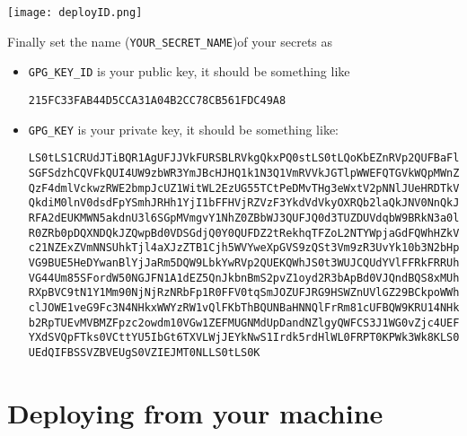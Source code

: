 \documentclass{ximera}
\begin{document}
\begin{image}
    \texttt{[image: deployID.png]}
\end{image}
        Finally set the name (\verb!YOUR_SECRET_NAME!)of your secrets as
        \begin{itemize}
            \item \verb!GPG_KEY_ID! is your public key, it should be something
                  like
                  \begin{verbatim}
215FC33FAB44D5CCA31A04B2CC78CB561FDC49A8
\end{verbatim}
            \item \verb!GPG_KEY! is your private key, it should be something
                  like:
                  {%
                  \begin{verbatim}
LS0tLS1CRUdJTiBQR1AgUFJJVkFURSBLRVkgQkxPQ0stLS0tLQoKbEZnRVp2QUFBaFlKS3dZQkJB
SGFSdzhCQVFkQUI4UW9zbWR3YmJBcHJHQ1k1N3Q1VmRVVkJGTlpWWEFQTGVkWQpMWnZtQ0tjQUFR
QzF4dmlVckwzRWE2bmpJcUZ1WitWL2EzUG55TCtPeDMvTHg3eWxtV2pNNlJUeHRDTkVkVzF0CmVT
QkdiM0lnV0dsdFpYSmhJRHh1YjI1bFFHVjRZVzF3YkdVdVkyOXRQb2laQkJNV0NnQkJGaUVFSVYv
RFA2dEUKMWN5akdnU3l6SGpMVmgvY1NhZ0ZBbWJ3QUFJQ0d3TUZDUVdqbW9BRkN3a0lCd0lDSWdJ
R0ZRb0pDQXNDQkJZQwpBd0VDSGdjQ0Y0QUFDZ2tRekhqTFZoL2NTYWpjaGdFQWhHZkVkYW9xRnZD
c21NZExZVmNNSUhkTjl4aXJzZTB1Cjh5WVYweXpGVS9zQSt3Vm9zR3UvYk10b3N2bHphMkRJUkQ3
VG9BUE5HeDYwanBlYjJaRm5DQW9LbkYwRVp2QUEKQWhJS0t3WUJCQUdYVlFFRkFRRUhRTitNMW52
VG44Um85SFordW50NGJFN1A1dEZ5QnJkbnBmS2pvZ1oyd2R3bApBd0VJQndBQS8xMUhNaFJuTnFL
RXpBVC9tN1Y1Mm90NjNjRzNRbFp1R0FFV0tqSmJOZUFJRG9HSWZnUVlGZ29BCkpoWWhCQ0Zmd3or
clJOWE1veG9Fc3N4NHkxWWYzRW1vQlFKbThBQUNBaHNNQlFrRm81cUFBQW9KRU14NHkxWWYKM0Vt
b2RpTUEvMVBMZFpzc2owdm10VGw1ZEFMUGNMdUpDandNZlgyQWFCS3J1WG0vZjc4UEFQOWM2eHdh
YXdSVQpFTks0VCttYU5IbGt6TXVLWjJEYkNwS1Irdk5rdHlWL0FRPT0KPWk3Wk8KLS0tLS1FTkQg
UEdQIFBSSVZBVEUgS0VZIEJMT0NLLS0tLS0K
\end{verbatim}
                  }
        \end{itemize}
        \pdfOnly{\end{multicols}}

\section{Deploying from your machine}
\end{document}
